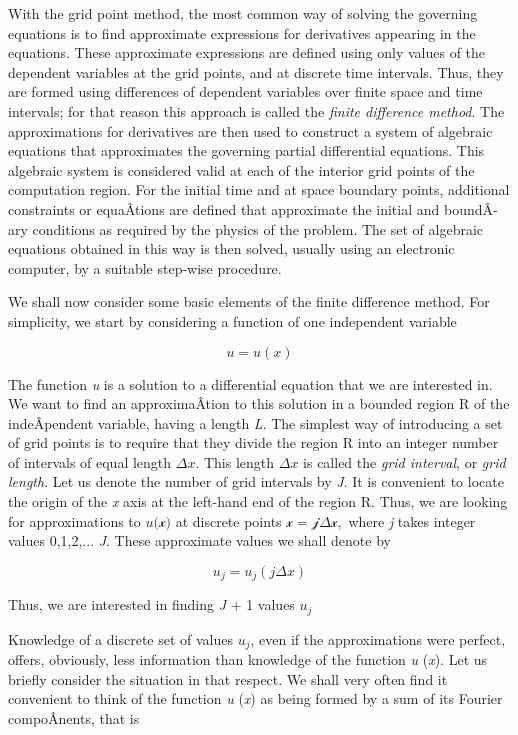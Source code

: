 With the grid point method, the most common way of solving the governing
equations is to find approximate expressions for derivatives appearing
in the equations. These approximate expressions are defined using only
values of the dependent variables at the grid points, and at discrete
time intervals. Thus, they are formed using differences of dependent
variables over finite space and time intervals; for that reason this
approach is called the \emph{finite difference method}. The
approximations for derivatives are then used to construct a system of
algebraic equations that approximates the governing partial differential
equations. This algebraic system is considered valid at each of the
interior grid points of the computation region. For the initial time and
at space boundary points, additional constraints or equaÂ­tions are
defined that approximate the initial and boundÂ­ary conditions as
required by the physics of the problem. The set of algebraic equations
obtained in this way is then solved, usually using an electronic
computer, by a suitable step-wise procedure.

We shall now consider some basic elements of the finite difference
method. For simplicity, we start by considering a function of one
independent variable

\[u = u(x)\]

The function \emph{u} is a solution to a differential equation that we
are interested in. We want to find an approximaÂ­tion to this solution in
a bounded region R of the indeÂ­pendent variable, having a length
\emph{L}. The simplest way of introducing a set of grid points is to
require that they divide the region R into an integer number of
intervals of equal length \(\Delta x\). This length \(\Delta x\) is
called the \emph{grid interval}, or \emph{grid length}. Let us denote
the number of grid intervals by \emph{J}. It is convenient to locate the
origin of the \emph{x} axis at the left-hand end of the region R. Thus,
we are looking for approximations to \(u (\mathcal{x)}\) at discrete
points \(\mathcal{x = j}\Delta\mathcal{x, }\) where \emph{j} takes
integer values 0,1,2,... \emph{J}. These approximate values we shall
denote by

\[u_j = u_j(j \Delta x)\]

Thus, we are interested in finding \emph{J} + 1 values \(u_ j\)

Knowledge of a discrete set of values \(u_j\), even if the
approximations were perfect, offers, obviously, less information than
knowledge of the function \emph{u} (\emph{x}). Let us briefly consider
the situation in that respect. We shall very often find it convenient to
think of the function \emph{u} (\emph{x}) as being formed by a sum of
its Fourier compoÂ­nents, that is

